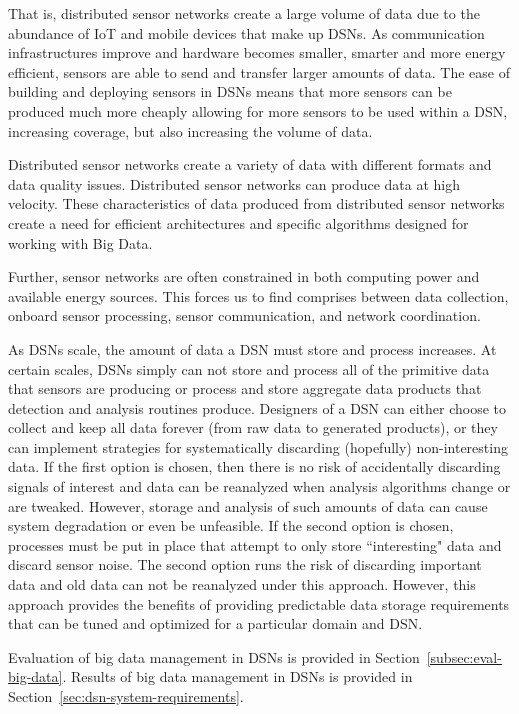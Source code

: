 That is, distributed sensor networks create a large volume of data due to the abundance of IoT and mobile devices that make up DSNs. As communication infrastructures improve and hardware becomes smaller, smarter and more energy efficient, sensors are able to send and transfer larger amounts of data. The ease of building and deploying sensors in DSNs means that more sensors can be produced much more cheaply allowing for more sensors to be used within a DSN, increasing coverage, but also increasing the volume of data.

Distributed sensor networks create a variety of data with different formats and data quality issues. Distributed sensor networks can produce data at high velocity. These characteristics of data produced from distributed sensor networks create a need for efficient architectures and specific algorithms designed for working with Big Data.

Further, sensor networks are often constrained in both computing power and available energy sources. This forces us to find comprises between data collection, onboard sensor processing, sensor communication, and network coordination.

As DSNs scale, the amount of data a DSN must store and process increases. At certain scales, DSNs simply can not store and process all of the primitive data that sensors are producing or process and store aggregate data products that detection and analysis routines produce. Designers of a DSN can either choose to collect and keep all data forever (from raw data to generated products), or they can implement strategies for systematically discarding (hopefully) non-interesting data. If the first option is chosen, then there is no risk of accidentally discarding signals of interest and data can be reanalyzed when analysis algorithms change or are tweaked. However, storage and analysis of such amounts of data can cause system degradation or even be unfeasible. If the second option is chosen, processes must be put in place that attempt to only store ``interesting" data and discard sensor noise.  The second option runs the risk of discarding important data and old data can not be reanalyzed under this approach. However, this approach provides the benefits of providing predictable data storage requirements that can be tuned and optimized for a particular domain and DSN.

Evaluation of big data management in DSNs is provided in Section~\ref{subsec:eval-big-data}. Results of big data management in DSNs is provided in Section~\ref{sec:dsn-system-requirements}.

